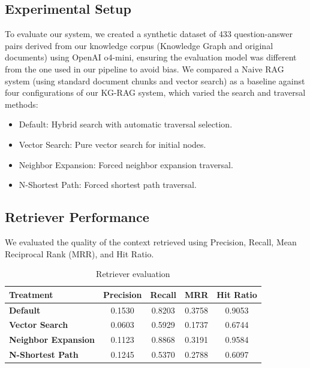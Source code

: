 \documentclass[conference]{IEEEtran}
\begin{document}
\subsection{Experimental Setup}
To evaluate our system, we created a synthetic dataset of 433 question-answer pairs derived from our knowledge corpus (Knowledge Graph and original documents) using OpenAI o4-mini, ensuring the evaluation model was different from the one used in our pipeline to avoid bias.
We compared a Naive RAG system (using standard document chunks and vector search) as a baseline against four configurations of our KG-RAG system, which varied the search and traversal methods:

\begin{itemize}
    \item Default: Hybrid search with automatic traversal selection.

    \item Vector Search: Pure vector search for initial nodes.

    \item Neighbor Expansion: Forced neighbor expansion traversal.

    \item N-Shortest Path: Forced shortest path traversal.
\end{itemize}

\subsection{Retriever Performance}
We evaluated the quality of the context retrieved using Precision, Recall, Mean Reciprocal Rank (MRR), and Hit Ratio.
\begin{table}[htbp]
    \caption{Retriever evaluation}
    \begin{center}
        \begin{tabular}{|l|c|c|c|c|}
            \hline
            \textbf{Treatment}          & \textbf{Precision} & \textbf{Recall} & \textbf{MRR} & \textbf{Hit Ratio} \\
            \hline
            \textbf{Default}            & 0.1530             & 0.8203          & 0.3758       & 0.9053             \\
            \hline
            \textbf{Vector Search}      & 0.0603             & 0.5929          & 0.1737       & 0.6744             \\
            \hline
            \textbf{Neighbor Expansion} & 0.1123             & 0.8868          & 0.3191       & 0.9584             \\
            \hline
            \textbf{N-Shortest Path}    & 0.1245             & 0.5370          & 0.2788       & 0.6097             \\
            \hline
        \end{tabular}
        \label{tab:retrieval-evaluation-result}
    \end{center}
\end{table}
\end{document}
